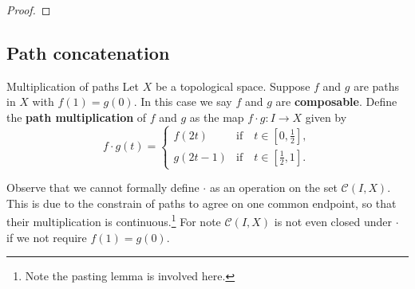 \begin{proof}
    

\end{proof}



\subsection*{Path concatenation}

\begin{definition}{Multiplication of paths}{}
    Let \(X\) be a topological space. Suppose \(f\) and \(g\) are paths in \(X\) with \(f(1)=g(0)\). In this case we say \(f\) and \(g\) are \textbf{composable}.
    Define   the \textbf{path multiplication} of \(f\) and \(g\) as the map \(f\cdot g\colon I\to X\) given by 
      \[
        f \cdot g (t)= \begin{cases}
            f(2t)   &\text{if}\quad t\in [0,\frac{1}{2}],\\
            g(2t-1) &\text{if}\quad t\in [\frac{1}{2},1].
        \end{cases}
    \] 
\end{definition}

Observe that we cannot formally define \(\cdot\) as an operation on the set \(\mathcal{C}(I,X)\). This is due to the constrain of paths  to agree on one common endpoint, so that their multiplication is continuous.\footnote{Note the pasting lemma is involved here. }
For note \(\mathcal{C}(I,X)\) is not even closed under \(\cdot\)  if we not require \(f(1)=g(0)\). 

